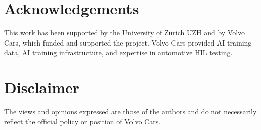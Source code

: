 \documentclass[a4paper,fleqn]{cas-dc}
\begin{document}
\section*{Acknowledgements}
This work has been supported by the University of Zürich UZH and by Volvo Cars, which funded and supported the project. Volvo Cars provided AI training data, AI training infrastructure, and expertise in automotive HIL testing.

\section*{Disclaimer}
The views and opinions expressed are those of the authors and do not necessarily reflect the official policy or position of Volvo Cars.




\balance
\end{document}
